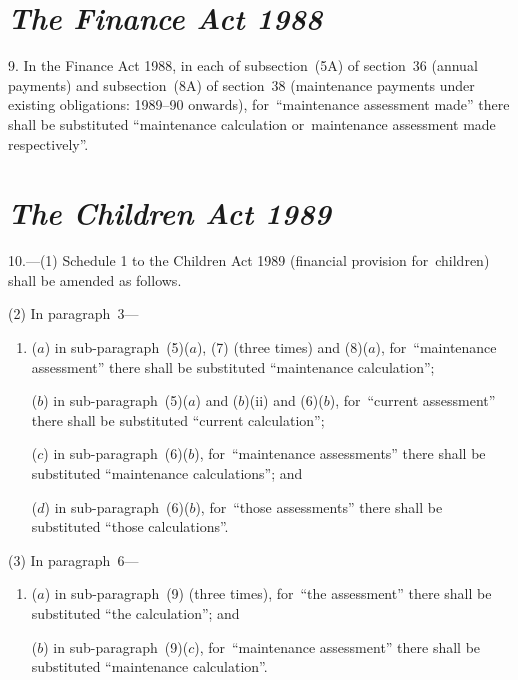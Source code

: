 \documentclass[12pt,a4paper]{article}
\begin{document}

\section*{\itshape The Finance Act 1988}

9. In the Finance Act 1988, in each of subsection~(5A)  of section~36 (annual payments) and subsection~(8A) of section~38 (maintenance payments under existing obligations: 1989--90 onwards), for~“maintenance assessment made” there shall be substituted “maintenance calculation or~maintenance assessment made respectively”.


\section*{\itshape The Children Act 1989}

10.---(1) Schedule 1 to the Children Act 1989 (financial provision for~children) shall be amended as follows.

(2) In paragraph~3—
\begin{enumerate}\item[]
($a$) in sub-paragraph~(5)($a$), (7)  (three times) and (8)($a$), for~“maintenance assessment” there shall be substituted “maintenance calculation”;

($b$) in sub-paragraph~(5)($a$)  and ($b$)(ii)  and (6)($b$), for~“current assessment” there shall be substituted “current calculation”;

($c$) in sub-paragraph~(6)($b$), for~“maintenance assessments” there shall be substituted “maintenance calculations”; and

($d$) in sub-paragraph~(6)($b$), for~“those assessments” there shall be substituted “those calculations”.
\end{enumerate}

(3) In paragraph~6—
\begin{enumerate}\item[]
($a$) in sub-paragraph~(9)  (three times), for~“the assessment” there shall be substituted “the calculation”; and

($b$) in sub-paragraph~(9)($c$), for~“maintenance assessment” there shall be substituted “maintenance calculation”.
\end{enumerate}
\end{document}
